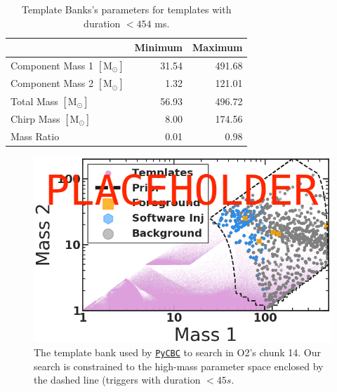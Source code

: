\documentclass[%
 reprint,
 amsmath,amssymb,
 aps,
]{revtex4}
\begin{document}
\begin{table}[t]

\caption[BBH parameters corresponding to durations $<454$ ms]{\label{tab:parameters}Template Banks's parameters for templates with duration $<454$ ms.}
\centering
\begin{tabular}{lrr}
\toprule
  & Minimum & Maximum\\
\midrule
Component Mass 1 $[\text{M}_{\odot}]$ & 31.54 & 491.68\\
Component Mass 2 $[\text{M}_{\odot}]$ & 1.32 & 121.01\\
Total Mass $[\text{M}_{\odot}]$ & 56.93 & 496.72\\
Chirp Mass $[\text{M}_{\odot}]$ & 8.00 & 174.56\\
Mass Ratio & 0.01 & 0.98\\
\end{tabular}
\end{table}



\begin{figure}[!h]

{\centering \includegraphics[width=0.75\linewidth]{images/template_bank_masses} 

}

\caption[High-mass BCR search space.]{The template bank used by \href{https://pycbc.org/}{\texttt{PyCBC}} to search in O2's chunk 14. Our search is constrained to the high-mass parameter space enclosed by the dashed line (triggers with duration \(<45s\).}\label{fig:templateBank}
\end{figure}
\end{document}
